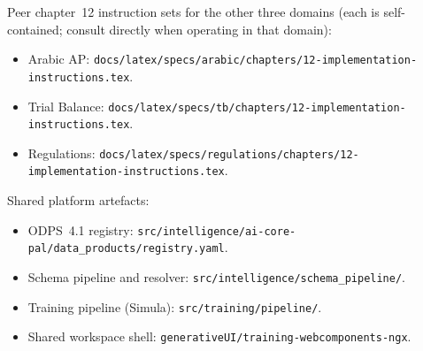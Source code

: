 Peer chapter~12 instruction sets for the other three domains (each
is self-contained; consult directly when operating in that domain):
\begin{itemize}
  \item Arabic AP:
    \texttt{docs/latex/specs/arabic/chapters/12-implementation-instructions.tex}.
  \item Trial Balance:
    \texttt{docs/latex/specs/tb/chapters/12-implementation-instructions.tex}.
  \item Regulations:
    \texttt{docs/latex/specs/regulations/chapters/12-implementation-instructions.tex}.
\end{itemize}

Shared platform artefacts:
\begin{itemize}
  \item ODPS~4.1 registry:
    \texttt{src/intelligence/ai-core-pal/data\_products/registry.yaml}.
  \item Schema pipeline and resolver:
    \texttt{src/intelligence/schema\_pipeline/}.
  \item Training pipeline (Simula):
    \texttt{src/training/pipeline/}.
  \item Shared workspace shell:
    \texttt{generativeUI/training-webcomponents-ngx}.
\end{itemize}
